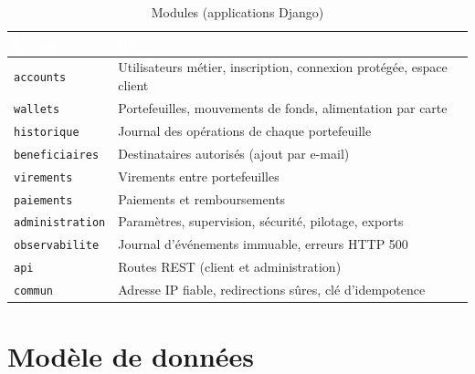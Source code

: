 \documentclass[11pt,a4paper]{report}
\newcommand{\entete}{\rowcolor{primaire}}
\newcommand{\tete}[1]{\textcolor{white}{\textbf{#1}}}
\newcommand{\code}[1]{\texttt{\small #1}}
\begin{document}
\begin{table}[H]
\centering
\caption{Modules (applications Django)}
\begin{tabularx}{\linewidth}{@{}p{3.2cm}Y@{}}
\toprule
\entete \tete{Module} & \tete{Rôle} \\
\midrule
\code{accounts} & Utilisateurs métier, inscription, connexion protégée, espace client \\
\code{wallets} & Portefeuilles, mouvements de fonds, alimentation par carte \\
\code{historique} & Journal des opérations de chaque portefeuille \\
\code{beneficiaires} & Destinataires autorisés (ajout par e-mail) \\
\code{virements} & Virements entre portefeuilles \\
\code{paiements} & Paiements et remboursements \\
\code{administration} & Paramètres, supervision, sécurité, pilotage, exports \\
\code{observabilite} & Journal d'événements immuable, erreurs HTTP 500 \\
\code{api} & Routes REST (client et administration) \\
\code{commun} & Adresse IP fiable, redirections sûres, clé d'idempotence \\
\bottomrule
\end{tabularx}
\end{table}

\section{Modèle de données}
\end{document}
